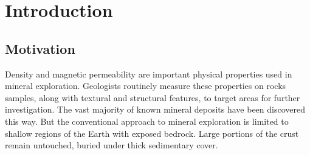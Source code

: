 \graphicspath{{./../Figures/}}
\chapter{Introduction}
\label{Chapter1}

\section{Motivation}

Density and magnetic permeability are important physical properties used in mineral exploration.  Geologists routinely measure these properties on rocks samples, along with textural and structural features, to target areas for further investigation. 
The vast majority of known mineral deposits have been discovered this way. But the conventional approach to mineral exploration is limited to shallow regions of the Earth with exposed bedrock. Large portions of the crust remain untouched, buried under thick sedimentary cover.


